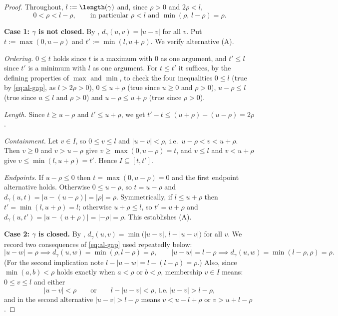 \begin{proof}
  Throughout, $l := \length(\gamma)$ and, since $\rho>0$ and $2\rho<l$,
  \begin{equation}
    \label{eq:al-gap}
    0 < \rho < l - \rho
    ,
    \qquad\text{in particular } \rho < l \text{ and } \min(\rho,\,l-\rho) = \rho
    .
  \end{equation}

  \textbf{Case 1: $\gamma$ is not closed.} By , $d_\gamma(u,v) = |u-v|$ for all
  $v$. Put $t := \max(0,u-\rho)$ and $t' := \min(l,u+\rho)$. We verify alternative (A).

  \emph{Ordering.} $0 \leq t$ holds since $t$ is a maximum with $0$ as one argument, and $t' \leq
  l$ since $t'$ is a minimum with $l$ as one argument. For $t \leq t'$ it suffices, by the
  defining properties of $\max$ and $\min$, to check the four inequalities $0 \leq l$ (true by
  \eqref{eq:al-gap}, as $l > 2\rho > 0$), $0 \leq u+\rho$ (true since $u \geq 0$ and $\rho>0$),
  $u-\rho \leq l$ (true since $u \leq l$ and $\rho > 0$) and $u - \rho \leq u+\rho$ (true since
  $\rho>0$).

  \emph{Length.} Since $t \geq u-\rho$ and $t' \leq u+\rho$, we get $t'-t \leq (u+\rho)-(u-\rho) =
  2\rho$.

  \emph{Containment.} Let $v \in I$, so $0 \leq v \leq l$ and $|u-v| < \rho$, i.e.\ $u - \rho < v <
  u+\rho$. Then $v \geq 0$ and $v > u-\rho$ give $v \geq \max(0,u-\rho) = t$, and $v \leq l$ and $v
  < u+\rho$ give $v \leq \min(l,u+\rho) = t'$. Hence $I \subseteq [t,t']$.

  \emph{Endpoints.} If $u - \rho \leq 0$ then $t = \max(0,u-\rho) = 0$ and the first endpoint
  alternative holds. Otherwise $0 \leq u-\rho$, so $t = u-\rho$ and $d_\gamma(u,t) = |u - (u-\rho)|
  = |\rho| = \rho$. Symmetrically, if $l \leq u+\rho$ then $t' = \min(l,u+\rho) = l$; otherwise
  $u+\rho \leq l$, so $t' = u+\rho$ and $d_\gamma(u,t') = |u-(u+\rho)| = |-\rho| = \rho$. This
  establishes (A).

  \textbf{Case 2: $\gamma$ is closed.} By , $d_\gamma(u,v) = \min\bigl(|u-v|,\,l -
  |u-v|\bigr)$ for all $v$. We record two consequences of \eqref{eq:al-gap} used repeatedly below:
  \begin{equation}
    \label{eq:al-dist}
    |u-w| = \rho \implies d_\gamma(u,w) = \min(\rho, l-\rho) = \rho
    ,
    \qquad
    |u-w| = l-\rho \implies d_\gamma(u,w) = \min(l-\rho,\rho) = \rho
    .
  \end{equation}
  (For the second implication note $l - |u-w| = l - (l-\rho) = \rho$.) Also, since $\min(a,b) <
  \rho$ holds exactly when $a < \rho$ or $b < \rho$, membership $v \in I$ means: $0 \leq v \leq l$
  and either
  \begin{equation}
    \label{eq:al-alt}
    |u-v| < \rho
    \qquad\text{or}\qquad
    l - |u-v| < \rho,\ \text{i.e.}\ |u-v| > l - \rho
    ,
  \end{equation}
  and in the second alternative $|u-v| > l-\rho$ means $v < u - l + \rho$ or $v > u + l - \rho$.


\end{proof}
